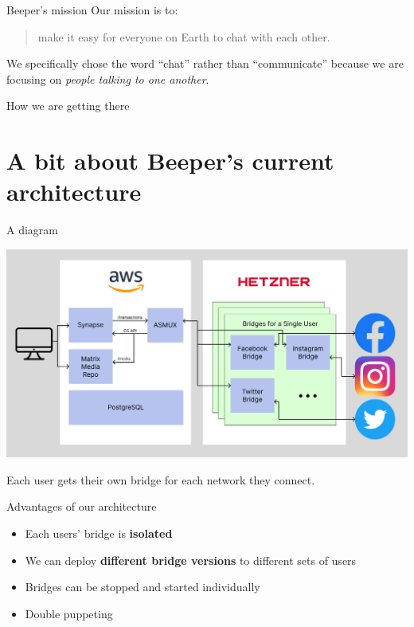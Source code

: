 \documentclass{beeper}
\begin{document}
\begin{frame}{Beeper's mission}
    Our mission is to:\\

    \begin{quote}
        make it easy for everyone on Earth to chat with each other.
    \end{quote}
    \pause

    We specifically chose the word ``chat'' rather than ``communicate'' because
    we are focusing on \textit{people talking to one another}.
\end{frame}

\begin{frame}{How we are getting there}

\end{frame}

\section{A bit about Beeper's current architecture}

\begin{frame}{A diagram}
    \centerline{\includegraphics[width=1.15\textwidth]{images/current-architecture}}

    Each user gets their own bridge for each network they connect.
\end{frame}

\begin{frame}{Advantages of our architecture}
    \begin{itemize}[<+->]
        \item Each users' bridge is \textbf{isolated}
        \item We can deploy \textbf{different bridge versions} to different sets
            of users
        \item Bridges can be stopped and started individually
        \item Double puppeting
    \end{itemize}
\end{frame}
\end{document}
